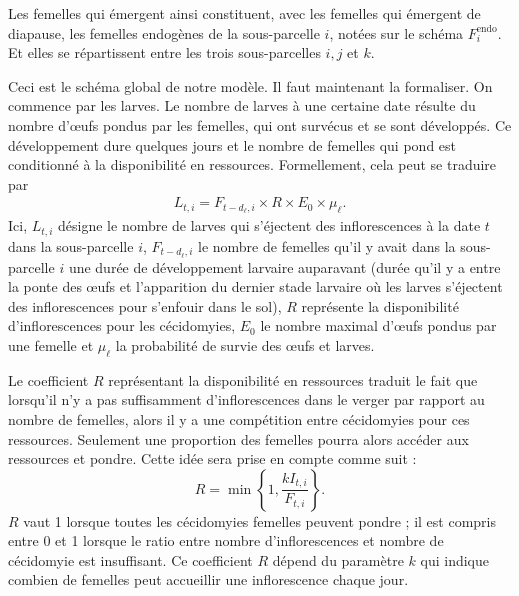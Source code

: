 Les femelles qui émergent ainsi constituent, avec les femelles qui émergent de diapause, les femelles endogènes de la sous-parcelle $i$, notées sur le schéma $F_i^{\text{endo}}$.
Et elles se répartissent entre les trois sous-parcelles $i, j$ et $k$.




Ceci est le schéma global de notre modèle.
Il faut maintenant la formaliser.
On commence par les larves.
Le nombre de larves à une certaine date résulte du nombre d'œufs pondus par les femelles, qui ont survécus et se sont développés.
Ce développement dure quelques jours et le nombre de femelles qui pond est conditionné à la disponibilité en ressources.
Formellement, cela peut se traduire par
\begin{align}
 L_{t, i} = F_{t - d_{\ell}, i} \times R \times E_0 \times \mu_{\ell}.
 \label{eq:larves}
\end{align}
Ici, $L_{t,i}$ désigne le nombre de larves qui s'éjectent des inflorescences à la date $t$ dans la sous-parcelle $i$, $F_{t - d_{\ell}, i}$ le nombre de femelles qu'il y avait dans la sous-parcelle $i$ une durée de développement larvaire auparavant (durée qu'il y a entre la ponte des œufs et l'apparition du dernier stade larvaire où les larves s'éjectent des inflorescences pour s'enfouir dans le sol), $R$ représente la disponibilité d'inflorescences pour les cécidomyies, $E_0$ le nombre maximal d'œufs pondus par une femelle et $\mu_{\ell}$ la probabilité de survie des œufs et larves.

Le coefficient $R$ représentant la disponibilité en ressources traduit le fait que lorsqu'il n'y a pas suffisamment d'inflorescences dans le verger par rapport au nombre de femelles, alors il y a une compétition entre cécidomyies pour ces ressources. Seulement une proportion des femelles pourra alors accéder aux ressources et pondre.
Cette idée sera prise en compte comme suit :
\[
R = \min\!\left\{1, \frac{k I_{t, i}}{ F_{t, i}} \right\}\!.
\]
$R$ vaut 1 lorsque toutes les cécidomyies femelles peuvent pondre ; il est compris entre 0 et 1 lorsque le ratio entre nombre d'inflorescences et nombre de cécidomyie est insuffisant.
Ce coefficient $R$ dépend du paramètre $k$ qui indique combien de femelles peut accueillir une inflorescence chaque jour.

